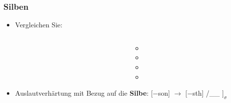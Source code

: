 \begin{frame}
\frametitle{Silben}

\begin{itemize}
	\item Vergleichen Sie:


\begin{columns}
\begin{column}[t]{.5\linewidth}
\eal 
	\ex {} \vs {}
	\ex {} \vs {} 
	\ex {} \vs {}
	\ex {} \vs {}
\zl	
\end{column}

\pause 

\begin{column}[t]{\linewidth}
\begin{itemize}
	\item[]  \vs {}
	\item[]  \vs {}
	\item[] \textipa{[bi:\alertred{k}.za:m]} \vs \textipa{[bi:.\alertred{g}@n]}
	\item[] \textipa{[le:\alertred{s}.b5]} \vs \textipa{[le:.\alertred{z}@n]}
\end{itemize}
\end{column}

\end{columns}	
\end{itemize}

\pause

\begin{itemize}
	\item Auslautverhärtung mit Bezug auf die \textbf{Silbe}:
	\ea
	{}[$-$son] $\rightarrow$ [$-$sth] /\_\_ $]_{\sigma}$
	\z	
\end{itemize}

\end{frame}


